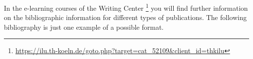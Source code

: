 In the e-learning courses of the Writing Center%
\footnote{\href{https://ilu.th-koeln.de/goto.php?target=cat_52109&client_id=thkilu}{https://ilu.th-koeln.de/goto.php?target=cat\_52109\&client\_id=thkilu}}
you will find further information on the bibliographic information for different 
types of publications. The following bibliography is just one example of a 
possible format.

